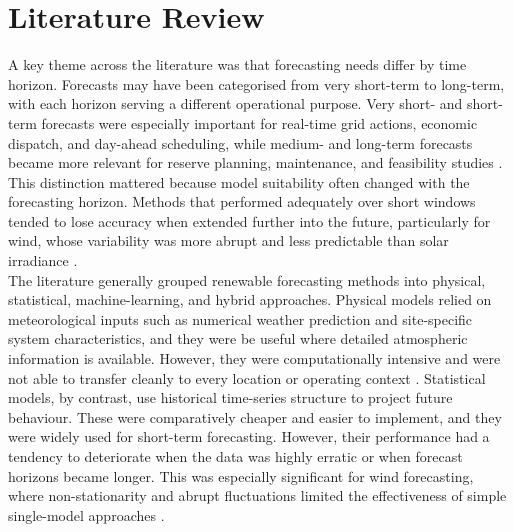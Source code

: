 \documentclass[conference]{IEEEtran}
\begin{document}
\section{Literature Review}
A key theme across the literature was that forecasting needs differ by time horizon. Forecasts may have been categorised from very short-term to long-term, with each horizon serving a different operational purpose. Very short- and short-term forecasts were especially important for real-time grid actions, economic dispatch, and day-ahead scheduling, while medium- and long-term forecasts became more relevant for reserve planning, maintenance, and feasibility studies \cite{chen_xu_china_data}. This distinction mattered because model suitability often changed with the forecasting horizon. Methods that performed adequately over short windows tended to lose accuracy when extended further into the future, particularly for wind, whose variability was more abrupt and less predictable than solar irradiance \cite{prema_review_forecast,alencar_wind_forecasting}. 
\\The literature generally grouped renewable forecasting methods into physical, statistical, machine-learning, and hybrid approaches. Physical models relied on meteorological inputs such as numerical weather prediction and site-specific system characteristics, and they were be useful where detailed atmospheric information is available. However, they were computationally intensive and were not able to transfer cleanly to every location or operating context \cite{islam_forecasting_resources}. Statistical models, by contrast, use historical time-series structure to project future behaviour. These were comparatively cheaper and easier to implement, and they were widely used for short-term forecasting. However, their performance had a tendency to deteriorate when the data was highly erratic or when forecast horizons became longer. This was especially significant for wind forecasting, where non-stationarity and abrupt fluctuations limited the effectiveness of simple single-model approaches \cite{alencar_wind_forecasting,prema_review_forecast}. 
\end{document}
